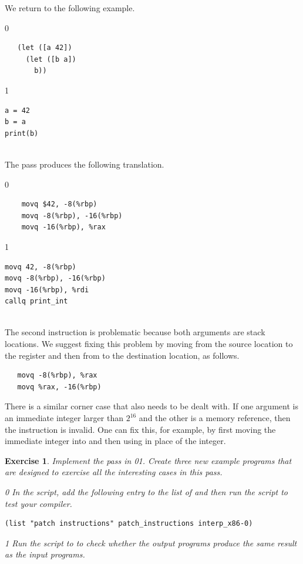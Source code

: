 \documentclass[7x10]{TimesAPriori_MIT}%
\def\racketEd{0}
\def\pythonEd{1}
\def\edition{1}
\newcommand{\racket}[1]{{\if\edition\racketEd{#1}\fi}}
\newcommand{\pythonColor}[0]{}
\newcommand{\python}[1]{{\if\edition\pythonEd\pythonColor #1\fi}}
\newtheorem{exercise}[theorem]{Exercise}
\numberwithin{theorem}{chapter}
\numberwithin{definition}{chapter}
\numberwithin{equation}{chapter}
\begin{document}
We return to the following example.\\
\begin{minipage}{0.5\textwidth}
{\if\edition\racketEd
\begin{lstlisting}
   (let ([a 42])
     (let ([b a])
       b))
\end{lstlisting}
\fi}
{\if\edition\pythonEd\pythonColor
\begin{lstlisting}
a = 42
b = a
print(b)
\end{lstlisting}
\fi}
\end{minipage}\\
The  pass produces the following translation. \\
\begin{minipage}{0.5\textwidth}
{\if\edition\racketEd
\begin{lstlisting}
    movq $42, -8(%rbp)
    movq -8(%rbp), -16(%rbp)
    movq -16(%rbp), %rax
\end{lstlisting}
\fi}
{\if\edition\pythonEd\pythonColor
\begin{lstlisting}
movq 42, -8(%rbp)
movq -8(%rbp), -16(%rbp)
movq -16(%rbp), %rdi
callq print_int
\end{lstlisting}
\fi}
\end{minipage}\\
The second  instruction is problematic because both
arguments are stack locations. We suggest fixing this problem by
moving from the source location to the register  and then
from  to the destination location, as follows.
\begin{lstlisting}
   movq -8(%rbp), %rax
   movq %rax, -16(%rbp)
\end{lstlisting}

There is a similar corner case that also needs to be dealt with. If
one argument is an immediate integer larger than $2^{16}$ and the
other is a memory reference, then the instruction is invalid.  One can
fix this, for example, by first moving the immediate integer into
 and then using  in place of the integer.

\begin{exercise}
\normalfont\normalsize Implement the  pass in
\racket{}\python{}.
Create three new example programs that are
designed to exercise all the interesting cases in this pass.
%
{\if\edition\racketEd
In the  script, add the following entry to the
list of  and then run the script to test your compiler.
\begin{lstlisting}
(list "patch instructions" patch_instructions interp_x86-0)
\end{lstlisting}
\fi}
{\if\edition\pythonEd\pythonColor
Run the  script to to check
whether the output programs produce the same result as the input
programs.
\fi}
\end{exercise}
\end{document}
